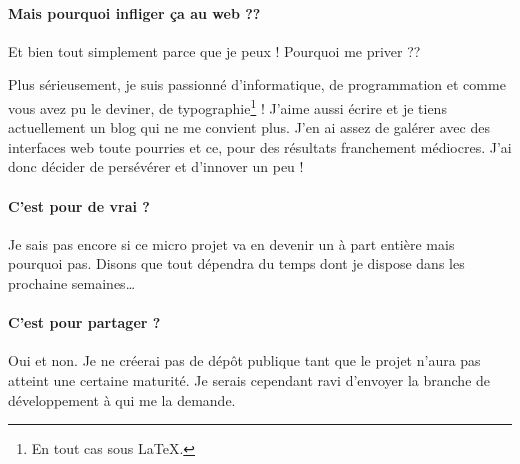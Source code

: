 \paragraph{Mais pourquoi infliger ça au web ??}  
Et bien tout simplement parce que je peux ! Pourquoi me priver ??

Plus sérieusement, je suis passionné d'informatique, de programmation et comme
vous avez pu le deviner, de typographie\footnote{En tout cas sous \LaTeX{}.} !
J'aime aussi écrire et je tiens actuellement un blog qui ne me convient plus. 
J'en ai assez de galérer avec des interfaces web toute pourries et ce, pour des 
résultats franchement médiocres. J'ai donc décider de persévérer et d'innover 
un peu ! 

\paragraph{C'est pour de vrai ?}
Je sais pas encore si ce micro projet va en devenir un à part entière mais
pourquoi pas. Disons que tout dépendra du temps dont je dispose dans les
prochaine semaines\ldots

\paragraph{C'est pour partager ?}
Oui et non. Je ne créerai pas de dépôt publique tant que le projet n'aura pas
atteint une certaine maturité. Je serais cependant ravi d'envoyer la branche de
développement à qui me la demande.
